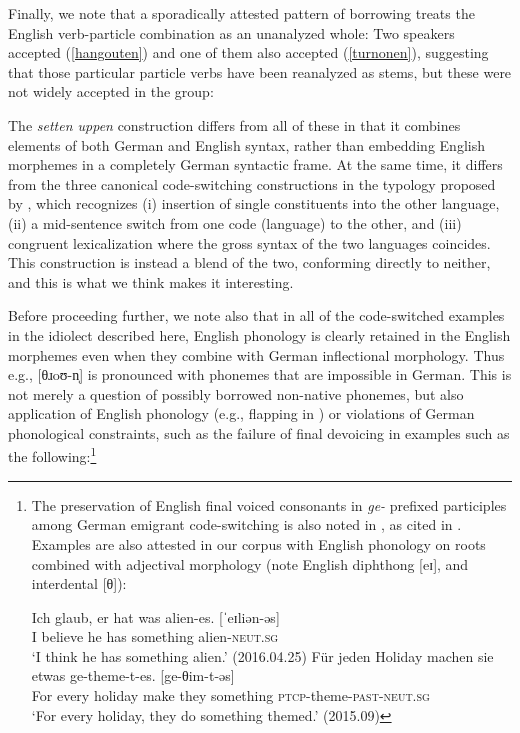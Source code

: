 \documentclass[output=paper]{langscibook}
\begin{document}
Finally, we note that a sporadically attested pattern of borrowing treats the English verb-particle combination as an unanalyzed whole: Two speakers accepted (\ref{hangouten}) and one of them also accepted (\ref{turnonen}), suggesting that those particular particle verbs have been reanalyzed as stems, but these were not widely accepted in the group:

\ea\judgewidth{\%}
\z\z 

The \textit{setten uppen} construction differs from all of these in that it combines elements of both German and English syntax, rather than embedding English morphemes in a completely German syntactic frame. At the same time, it differs from the three canonical code-switching constructions in the typology proposed by \citet{muysken00}, which recognizes (i) insertion of single constituents into the other language, (ii) a mid-sentence switch from one code (language) to the other, and (iii) congruent lexicalization where the gross syntax of the two languages coincides. This construction is instead a blend of the two, conforming directly to neither, and this is what we think makes it interesting.

Before proceeding further, we note also that in all of the code-switched examples in the idiolect described here, English phonology is clearly retained in the English morphemes even when they combine with German inflectional morphology. Thus e.g., {[}θɹoʊ\nobreakdash-n̩{]} is pronounced with phonemes that are impossible in German. This is not merely a question of possibly borrowed non-native phonemes, but also application of English phonology (e.g., flapping in ) or violations of German phonological constraints, such as the failure of final devoicing in examples such as the following:\footnote{The preservation of English final voiced consonants in \textit{ge-} prefixed participles among German emigrant code-switching is also noted in \citet{gross00}, as cited in \citet[159--160]{myersscotton02}. Examples are also attested in our corpus with English phonology on roots combined with adjectival morphology (note English diphthong {[}eɪ{]}, and interdental {[}θ{]}):

\ea\gll Ich glaub, er hat was {alien-es. {[}ˈeɪliən-əs{]}}\\
I believe he has something alien-\textsc{neut.sg}\\
\glt `I think he has something alien.' (2016.04.25)
\ex\gll Für jeden Holiday machen sie etwas {ge-theme-t-es. {[}ge-θim-t-əs{]}}\\
For every holiday make they something \textsc{ptcp}-theme-\textsc{past}-\textsc{neut.sg}\\
\glt `For every holiday, they do something themed.' (2015.09)
\z
}
\end{document}
